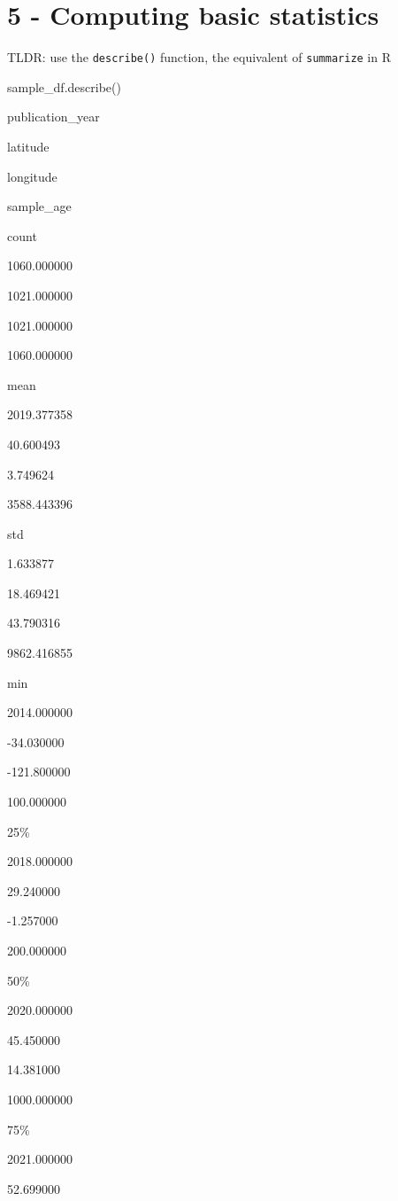\documentclass[
  letterpaper,
]{book}
\newenvironment{Shaded}{}{}
\newcommand{\NormalTok}[1]{\textcolor[rgb]{0.14,0.16,0.18}{#1}}
\begin{document}
\hypertarget{computing-basic-statistics}{%
\section{5 - Computing basic
statistics}\label{computing-basic-statistics}}

TLDR: use the \texttt{describe()} function, the equivalent of
\texttt{summarize} in R

\begin{Shaded}
\begin{Highlighting}[]
\NormalTok{sample\_df.describe()}
\end{Highlighting}
\end{Shaded}

publication\_year

latitude

longitude

sample\_age

count

1060.000000

1021.000000

1021.000000

1060.000000

mean

2019.377358

40.600493

3.749624

3588.443396

std

1.633877

18.469421

43.790316

9862.416855

min

2014.000000

-34.030000

-121.800000

100.000000

25\%

2018.000000

29.240000

-1.257000

200.000000

50\%

2020.000000

45.450000

14.381000

1000.000000

75\%

2021.000000

52.699000
\end{document}
